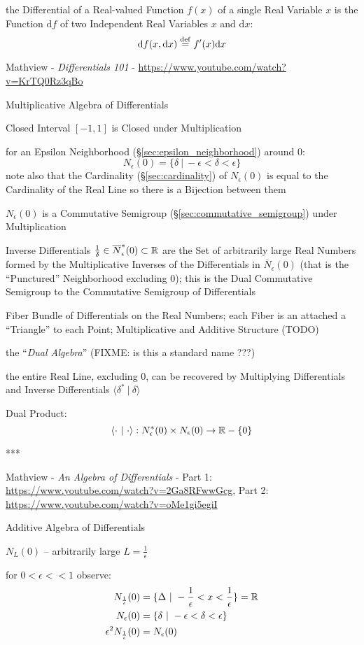the Differential of a Real-valued Function $f(x)$ of a single Real Variable $x$
is the Function $\mathrm{d}f$ of two Independent Real Variables $x$ and
$\mathrm{d}x$:
\[
  \mathrm{d}f(x, \mathrm{d}x) \stackrel{\mathrm{def}}= f'(x)\mathrm{d}x
\]

\asterism

Mathview - \emph{Differentials 101} -
\url{https://www.youtube.com/watch?v=KrTQ0Rz3qBo}

Multiplicative Algebra of Differentials

Closed Interval $[-1, 1]$ is Closed under Multiplication

for an Epsilon Neighborhood (\S\ref{sec:epsilon_neighborhood}) around $0$:
\[
  N_\epsilon(0) = \{ \delta \ |\ -\epsilon < \delta < \epsilon \}
\]
note also that the Cardinality (\S\ref{sec:cardinality}) of $N_\epsilon(0)$ is
equal to the Cardinality of the Real Line so there is a Bijection between them

$N_\epsilon(0)$ is a Commutative Semigroup (\S\ref{sec:commutative_semigroup})
under Multiplication

Inverse Differentials $\frac{1}{\delta} \in \overline{N}_\epsilon^*(0)
\subset \mathbb{R}$ are the Set of arbitrarily large Real Numbers formed by the
Multiplicative Inverses of the Differentials in $\overline{N}_\epsilon(0)$ (that
is the ``Punctured'' Neighborhood excluding $0$); this is the Dual Commutative
Semigroup to the Commutative Semigroup of Differentials

Fiber Bundle of Differentials on the Real Numbers; each Fiber is an attached a
``Triangle'' to each Point; Multiplicative and Additive Structure (TODO)

the ``\emph{Dual Algebra}''
(FIXME: is this a standard name ???)

the entire Real Line, excluding $0$, can be recovered by Multiplying
Differentials and Inverse Differentials $\langle \delta^* \ |\ \delta \rangle$

Dual Product:
\[
  \langle \cdot \ |\ \cdot\rangle :
    N_\epsilon^*(0) \times N_\epsilon(0) \rightarrow \reals - \{0\}
\]

***

Mathview - \emph{An Algebra of Differentials} -
Part 1: \url{https://www.youtube.com/watch?v=2Ga8RFwwGcg}, Part 2:
\url{https://www.youtube.com/watch?v=oMe1gi5egiI}

Additive Algebra of Differentials

$N_L(0)$ -- arbitrarily large $L = \frac{1}{\epsilon}$

for $0 < \epsilon << 1$ observe:
\begin{align*}
  N_{\frac{1}{\epsilon}}(0) & =
    \{ \Delta \ |\ -\frac{1}{\epsilon} < x < \frac{1}{\epsilon} \} = \mathbb{R} \\
  N_\epsilon(0) & = \{ \delta \ |\ -\epsilon < \delta < \epsilon \} \\
  \epsilon^2 N_{\frac{1}{\epsilon}}(0) & = N_\epsilon(0)
\end{align*}

